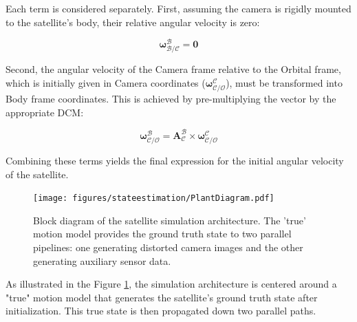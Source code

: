 \noindent
Each term is considered separately. First, assuming the camera is rigidly mounted to the satellite's body, their relative angular velocity is zero:

\begin{equation}
    \boldsymbol{\omega}_{\mathcal{B/C}}^{\mathcal{B}} = \mathbf{0}  
\end{equation}

\noindent
Second, the angular velocity of the Camera frame relative to the Orbital frame, which is initially given in Camera coordinates ($\boldsymbol{\omega}_{\mathcal{C/O}}^{\mathcal{C}}$), must be transformed into Body frame coordinates. This is achieved by pre-multiplying the vector by the appropriate DCM:

\begin{equation}
    \boldsymbol{\omega}_{\mathcal{C/O}}^{\mathcal{B}} = \mathbf{A}_\mathcal{C}^\mathcal{B} \times \boldsymbol{\omega}_{\mathcal{C/O}}^{\mathcal{C}}  
\end{equation}

\noindent
Combining these terms yields the final expression for the initial angular velocity of the satellite.

\label{sec:fullsystemdiagram}


\begin{figure}[H]
    \centering
    \texttt{[image: figures/stateestimation/PlantDiagram.pdf]}
    \caption{Block diagram of the satellite simulation architecture. The 'true' motion model provides the ground 
    truth state to two parallel pipelines: one generating distorted camera images and the other generating auxiliary sensor data.}
    \label{fig:Plant Diagram}
\end{figure}

As illustrated in the Figure \ref{fig:Plant Diagram}, the simulation architecture is centered around a "true" motion model that generates the satellite's ground truth state after initialization. This true 
state is then propagated down two parallel paths.
\vspace{0.5cm}

